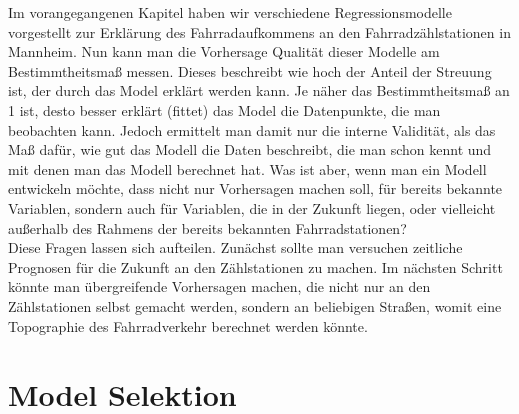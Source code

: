 \documentclass[a4paper,12pt]{thesis}
\begin{document}
Im vorangegangenen Kapitel haben wir verschiedene Regressionsmodelle vorgestellt zur Erklärung des Fahrradaufkommens an den Fahrradzählstationen in Mannheim. Nun kann man die Vorhersage Qualität dieser Modelle am Bestimmtheitsmaß messen. Dieses beschreibt wie hoch der Anteil der Streuung ist, der durch das Model erklärt werden kann. Je näher das Bestimmtheitsmaß an 1 ist, desto besser erklärt (fittet) das Model die Datenpunkte, die man beobachten kann. Jedoch ermittelt man damit nur die interne Validität, als das Maß dafür, wie gut das Modell die Daten beschreibt, die man schon kennt und mit denen man das Modell berechnet hat. Was ist aber, wenn man ein Modell entwickeln möchte, dass nicht nur Vorhersagen machen soll, für bereits bekannte Variablen, sondern auch für Variablen, die in der Zukunft liegen, oder vielleicht außerhalb des Rahmens der bereits bekannten Fahrradstationen?\\
Diese Fragen lassen sich aufteilen. Zunächst sollte man versuchen zeitliche Prognosen für die Zukunft an den Zählstationen zu machen. Im nächsten Schritt könnte man übergreifende Vorhersagen machen, die nicht nur an den Zählstationen selbst gemacht werden, sondern an beliebigen Straßen, womit eine Topographie des Fahrradverkehr berechnet werden könnte.\\

\section{Model Selektion}
\end{document}
